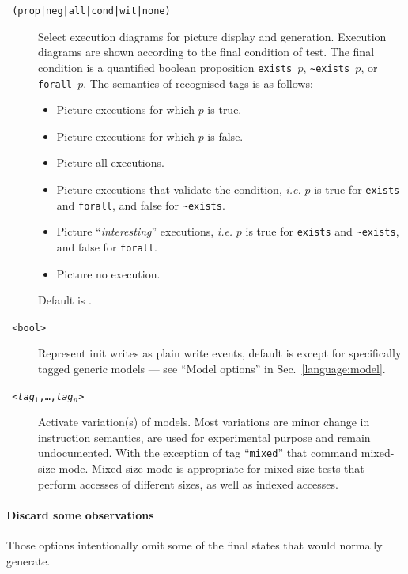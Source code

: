 \begin{description}
\item[{\tt {} (prop|neg|all|cond|wit|none)}]
Select execution diagrams for picture display and generation.
Execution diagrams are shown according to
the final condition of test. The final condition is a quantified boolean
proposition \verb+exists +$p$, \verb+~exists +$p$, or \verb+forall +$p$.
The semantics of recognised tags is as follows:
\begin{itemize}
\item {} Picture executions for which $p$ is true.
\item {} Picture executions for which $p$ is false.
\item {}  Picture all executions.
\item {} Picture executions that validate  the condition,
\emph{i.e.} $p$ is true for \verb+exists+ and \verb+forall+, and false
for \verb+~exists+.
\item {} Picture ``\emph{interesting}'' executions,
\emph{i.e.} $p$ is true for \verb+exists+ and \verb+~exists+,
and false for \verb+forall+.
\item {} Picture no  execution.
\end{itemize}
Default is .

\item[{\tt {}  <bool>}]
Represent init writes as plain write events, default is  except
for specifically tagged generic models --- see ``Model options''
in Sec.~\ref{language:model}.

\item[{\tt {} <\textit{tag}$_1$,\ldots,\textit{tag}$_n$>}]
Activate variation(s) of models. Most variations are minor change in instruction semantics,
are used for experimental purpose and remain undocumented. With the exception of tag
``\texttt{mixed}'' that command mixed-size mode. Mixed-size mode is appropriate for mixed-size
tests that perform accesses of different sizes, as well as indexed accesses.

\end{description}

\paragraph*{Discard some observations}
Those options intentionally omit some of the final states that \herd{} would
normally generate.


